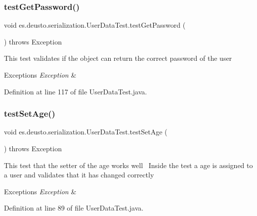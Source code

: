 \subsubsection{\texorpdfstring{test\+Get\+Password()}{testGetPassword()}}
{\footnotesize\ttfamily void es.\+deusto.\+serialization.\+User\+Data\+Test.\+test\+Get\+Password (\begin{DoxyParamCaption}{ }\end{DoxyParamCaption}) throws Exception}

This test validates if the object can return the correct password of the user 
\begin{DoxyExceptions}{Exceptions}
{\em Exception} & \\
\hline
\end{DoxyExceptions}


Definition at line 117 of file User\+Data\+Test.\+java.

\mbox{\label{classes_1_1deusto_1_1serialization_1_1_user_data_test_aa3241903064474a486744a64fbcd9c13}} 
\subsubsection{\texorpdfstring{test\+Set\+Age()}{testSetAge()}}
{\footnotesize\ttfamily void es.\+deusto.\+serialization.\+User\+Data\+Test.\+test\+Set\+Age (\begin{DoxyParamCaption}{ }\end{DoxyParamCaption}) throws Exception}

This test that the setter of the age works well~\newline
Inside the test a age is assigned to a user and validates that it has changed correctly~\newline

\begin{DoxyExceptions}{Exceptions}
{\em Exception} & \\
\hline
\end{DoxyExceptions}


Definition at line 89 of file User\+Data\+Test.\+java.

\mbox{\label{classes_1_1deusto_1_1serialization_1_1_user_data_test_a4f08dcab38f34ee37a4417e6c3e3e8e8}} 

